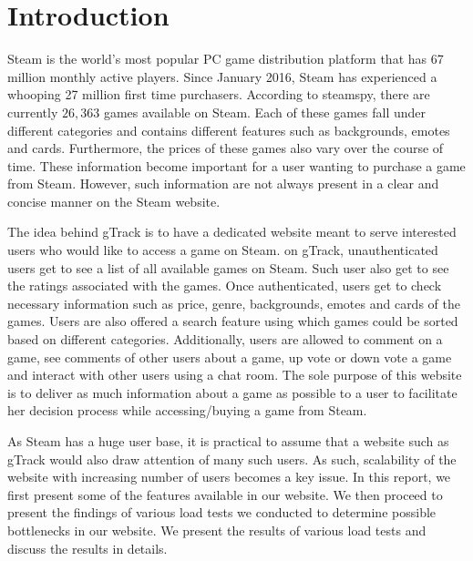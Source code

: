 \chapter{Introduction}

Steam is the world's most popular PC game distribution platform that has 67 million monthly active players. Since January 2016, Steam has experienced a whooping 27 million first time purchasers. According to steamspy, there are currently $26,363$ games available on Steam. Each of these games fall under different categories and contains different features such as backgrounds, emotes and cards. Furthermore, the prices of these games also vary over the course of time. These information become important for a user wanting to purchase a game from Steam. However, such information are not always present in a clear and concise manner on the Steam website. 

The idea behind gTrack is to have a dedicated website meant to serve interested users who would like to access a game on Steam. on gTrack, unauthenticated users get to see a list of all available games on Steam. Such user also get to see the ratings associated with the games. Once authenticated, users get to check necessary information such as price, genre, backgrounds, emotes and cards of the games. Users are also offered a search feature using which games could be sorted based on different categories. Additionally, users are allowed to comment on a game, see comments of other users about a game, up vote or down vote a game and interact with other users using a chat room. The sole purpose of this website is to deliver as much information about a game as possible to a user to facilitate her decision process while accessing/buying a game from Steam.

As Steam has a huge user base, it is practical to assume that a website such as gTrack would also draw attention of many such users. As such, scalability of the website with increasing number of users becomes a key issue. In this report, we first present some of the features available in our website. We then proceed to present the findings of various load tests we conducted to determine possible bottlenecks in our website. We present the results of various load tests and discuss the results in details.  


